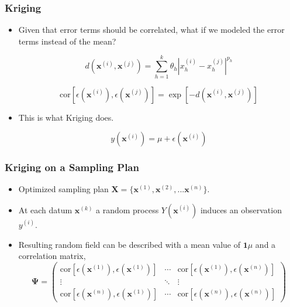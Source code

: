 \begin{frame}
\frametitle{Kriging}

\begin{itemize}
  \item Given that error terms should be correlated, what if we modeled the error terms instead of the mean?

\begin{equation}
   d\left( \textbf{x}^{(i)}, \textbf{x}^{(j)} \right) = \sum_{h=1}^{k} \theta_h \left| x_h^{(i)} - x_h^{(j)} \right|^{p_h} \nonumber
\end{equation}

\begin{equation}
   \text{cor} \left[ \epsilon\left( \textbf{x}^{(i)} \right) , \epsilon\left( \textbf{x}^{(j)} \right)  \right] =
      \exp\left[ -d\left( \textbf{x}^{(i)}, \textbf{x}^{(j)} \right) \right]  \nonumber
\end{equation}

  \item This is what Kriging does.

\begin{equation}
   y\left( \textbf{x}^{(i)} \right) = \mu + \epsilon\left( \textbf{x}^{(i)} \right) \nonumber
\end{equation}

\end{itemize}

\end{frame}
\begin{frame}
\frametitle{Kriging on a Sampling Plan}

\begin{itemize}
  \item Optimized sampling plan $\textbf{X}=\lbrace \textbf{x}^{(1)}, \textbf{x}^{(2)}, ... \textbf{x}^{(n)}\rbrace$. 
  \item At each datum $\textbf{x}^{(k)}$ a random process $Y(\textbf{x}^{(i)})$ induces an observation $y^{(i)}$.
  \item Resulting random field can be described with a mean value of $\textbf{1}\mu$ and a correlation matrix,
\begin{equation}
 \boldsymbol{\Psi} =
 \begin{pmatrix} 
	\text{cor} \left[ \epsilon\left( \textbf{x}^{(1)} \right) , \epsilon\left( \textbf{x}^{(1)} \right)  \right] & \cdots & 
		\text{cor} \left[ \epsilon\left( \textbf{x}^{(1)} \right) , \epsilon\left( \textbf{x}^{(n)} \right)  \right]  \\
	\vdots & \ddots & \vdots \\ 
	\text{cor} \left[ \epsilon\left( \textbf{x}^{(n)} \right) , \epsilon\left( \textbf{x}^{(1)} \right)  \right]  & \cdots & 
		\text{cor} \left[ \epsilon\left( \textbf{x}^{(n)} \right) , \epsilon\left( \textbf{x}^{(n)} \right)  \right] 
 \end{pmatrix} \nonumber
\end{equation}  

\end{itemize}

\end{frame}
